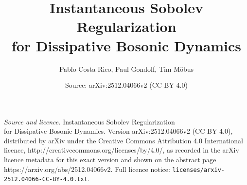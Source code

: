 \documentclass[10pt,a4paper]{amsart}
\title{\texorpdfstring{Instantaneous Sobolev Regularization \\ for Dissipative Bosonic Dynamics}{Instantaneous Sobolev Regularization for Dissipative Bosonic Dynamics}}
\author{Pablo Costa Rico, Paul Gondolf, Tim M\"{o}bus}
\date{Source: arXiv:2512.04066v2 (CC BY 4.0)}
\begin{document}
\maketitle

\noindent\emph{Source and licence.} \texorpdfstring{Instantaneous Sobolev Regularization \\ for Dissipative Bosonic Dynamics}{Instantaneous Sobolev Regularization for Dissipative Bosonic Dynamics}. Version arXiv:2512.04066v2 (CC BY 4.0), distributed by arXiv under the Creative Commons Attribution 4.0 International licence, http://creativecommons.org/licenses/by/4.0/, as recorded in the arXiv licence metadata for this exact version and shown on the abstract page https://arxiv.org/abs/2512.04066v2. Full licence notice: \texttt{licenses/arxiv-2512.04066-CC-BY-4.0.txt}.\par\smallskip
\end{document}
